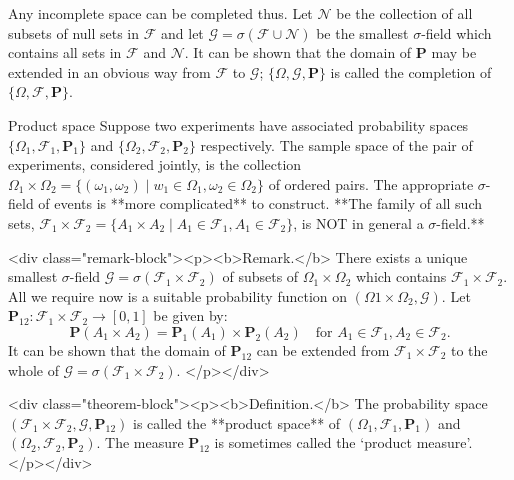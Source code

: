 Any incomplete space can be completed thus. Let $\mathcal{N}$ be the collection of all subsets of null sets in $\mathcal{F}$ and let $\mathcal{G} = \sigma (\mathcal{F} \cup \mathcal{N})$ be the smallest $\sigma$-field which contains all sets in $\mathcal{F}$ 
and $\mathcal{N}$. It can be shown that the domain of $\mathbf{P}$ may be extended in an obvious way from $\mathcal{F}$ to $\mathcal{G}$; $\{\Omega, \mathcal{G}, \mathbf{P}\}$ is called the completion of $\{\Omega, \mathcal{F}, \mathbf{P}\}$. 

\begin{newnotion}{Product space}
Suppose two experiments have associated probability spaces $\{ \Omega_1, \mathcal{F}_1, \mathbf{P}_1 \}$ and  $\{ \Omega_2, \mathcal{F}_2, \mathbf{P}_2 \}$ respectively. The sample space of the pair of experiments, considered jointly, is the collection $\Omega_1 \times \Omega_2 = \{ (\omega_1 , \omega_2) \;\vert\; w_1 \in \Omega_1, \omega_2 \in \Omega_2 \}$ of ordered pairs. The appropriate $\sigma$-field of events is **more complicated** to construct. **The family of all such sets, $\mathcal{F}_1 \times \mathcal{F}_2 = \{A_1 \times A_2 \;\vert\; A_1 \in \mathcal{F}_1 , A_1 \in \mathcal{F}_2 \}$, is NOT in general a $\sigma$-field.**
\end{newnotion}

<div class="remark-block"><p><b>Remark.</b> 
There exists a unique smallest $\sigma$-field $\mathcal{G} = \sigma(\mathcal{F}_1 \times \mathcal{F}_2)$ of subsets of $\Omega_1 \times \Omega_2$ which contains $\mathcal{F}_1 \times \mathcal{F}_2$. All we require now is a suitable probability function on $( \Omega1 \times \Omega_2, \mathcal{G} )$. Let $\mathbf{P}_{12}: \mathcal{F}_1 \times \mathcal{F}_2 \to [0, 1]$ be given by: 
$$\begin{equation}
    \mathbf{P}(A_1 \times A_2) = \mathbf{P}_1(A_1) \times \mathbf{P}_2(A_2) \quad \text{for $A_1 \in \mathcal{F}_1, A_2 \in \mathcal{F}_2$}.
\end{equation}$$
It can be shown that the domain of $\mathbf{P}_{12}$ can be extended from $\mathcal{F}_1 \times \mathcal{F}_2$ to the whole of $\mathcal{G} = \sigma(\mathcal{F}_1 \times \mathcal{F}_2)$.
</p></div>

<div class="theorem-block"><p><b>Definition.</b> 
The probability space $(\mathcal{F}_1 \times \mathcal{F}_2, \mathcal{G}, \mathbf{P}_{12})$ is called the **product space** of $(\Omega_1, \mathcal{F}_1, \mathbf{P}_1)$ and  $(\Omega_2, \mathcal{F}_2, \mathbf{P}_2)$. The measure $\mathbf{P}_{12}$ is sometimes called the `product measure'. 
</p></div>



